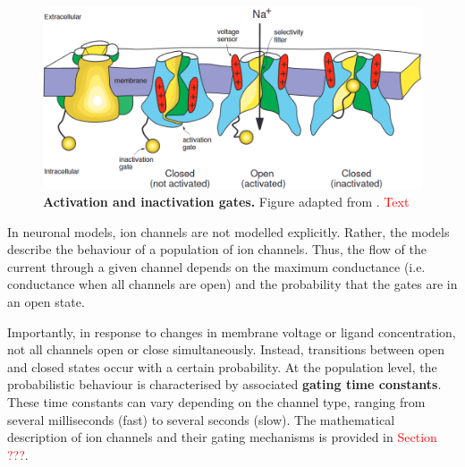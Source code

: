 \documentclass[../main.tex]{subfiles}
\begin{document}
\begin{figure}[!t]
    \centering
    \includegraphics[width=0.85\linewidth]{../img/sleep_and_r5_network/structure_of_v_gated_channels.png}
    \caption[Activation and inactivation gates]{
        \textbf{Activation and inactivation gates.}
        Figure adapted from \cite{izhikevichDynamicalSystemsNeuroscience2006}.
        \textcolor{red}{Text}
    }
    \label{fig:voltage_gated_channel_structure}
\end{figure}

In neuronal models, ion channels are not modelled explicitly. Rather, the models describe the behaviour of a population of ion channels. Thus, the flow of the current through a given channel depends on the maximum conductance (i.e. conductance when all channels are open) and the probability that the gates are in an open state.

Importantly, in response to changes in membrane voltage or ligand concentration, not all channels open or close simultaneously. Instead, transitions between open and closed states occur with a certain probability. At the population level, the probabilistic behaviour is characterised by associated \textbf{gating time constants}. These time constants can vary depending on the channel type, ranging from several milliseconds (fast) to several seconds (slow). The mathematical description of ion channels and their gating mechanisms is provided in \textcolor{red}{Section ???}.




\end{document}
